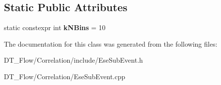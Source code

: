 \subsection*{Static Public Attributes}
\begin{DoxyCompactItemize}
\item 
\mbox{\label{classQn_1_1EseSubEvent_a98a8b4d32230d9e80900f33b07a5d0ff}} 
static constexpr int {\bfseries k\+N\+Bins} = 10
\end{DoxyCompactItemize}


The documentation for this class was generated from the following files\+:\begin{DoxyCompactItemize}
\item 
D\+T\+\_\+\+Flow/\+Correlation/include/Ese\+Sub\+Event.\+h\item 
D\+T\+\_\+\+Flow/\+Correlation/Ese\+Sub\+Event.\+cpp\end{DoxyCompactItemize}
